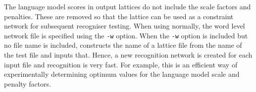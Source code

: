 The language model scores in output lattices do not include the scale factors
and penalties.  These are removed so that the lattice can be used as a
constraint network for subsequent recogniser testing.  When using 
normally, the word level network file is specified using the \texttt{-w}
option.  When the \texttt{-w} option is included but no file name is included,
 constructs the name of a lattice file from the name of the test
file and inputs that.  Hence, a new recognition network is created for each
input file and recognition is very fast.  For example, this is an efficient way
of experimentally determining optimum values for the language 
model scale and
penalty factors.


